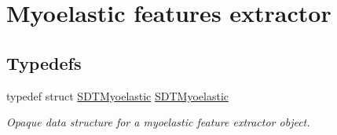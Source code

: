 \hypertarget{group__myoelastic}{}\section{Myoelastic features extractor}
\label{group__myoelastic}
\subsection*{Typedefs}
\begin{DoxyCompactItemize}
\item 
\hypertarget{group__myoelastic_gaaaf3320e161f43bf74a8c802519e5c3e}{}typedef struct \hyperlink{group__myoelastic_gaaaf3320e161f43bf74a8c802519e5c3e}{S\+D\+T\+Myoelastic} \hyperlink{group__myoelastic_gaaaf3320e161f43bf74a8c802519e5c3e}{S\+D\+T\+Myoelastic}\label{group__myoelastic_gaaaf3320e161f43bf74a8c802519e5c3e}

\begin{DoxyCompactList}\small\item\em Opaque data structure for a myoelastic feature extractor object. \end{DoxyCompactList}\end{DoxyCompactItemize}
